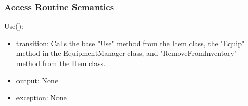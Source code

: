 \documentclass[12pt]{article}
\newcommand{\authornote}[3]{\textcolor{#1}{[#3 ---#2]}}
\newcommand{\authornote}[3]{}
\newcommand{\wss}[1]{\authornote{blue}{SS}{#1}}
\begin{document}
\subsubsection* {Access Routine Semantics}

\noindent Use():
\begin{itemize}
\item transition: Calls the base "Use" method from the Item class, the "Equip" method in the EquipmentManager class, and "RemoveFromInventory" method from the Item class.
\item output: None
\item exception: None
\end{itemize}

%
%
%
%
%

\newpage
\end{document}
